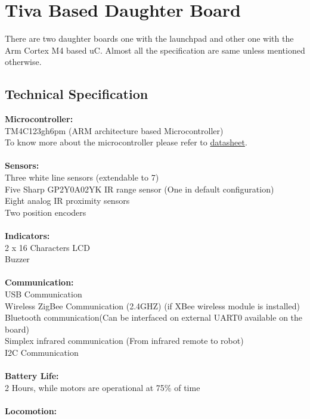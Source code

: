 \documentclass[a4paper,10pt,oneside]{article}
\begin{document}
{	\section{\Huge\textbf{Tiva Based Daughter Board}}
		{There are two daughter boards one with the launchpad and other one with the Arm Cortex M4 based uC. Almost all the specification are same unless mentioned otherwise.\\}
		\subsection{{\huge \textbf{Technical Specification}}\\}
			{\textbf{Microcontroller:\\}
			TM4C123gh6pm (ARM architecture based Microcontroller)\\ To know more about the microcontroller please refer to \href{www.ti.com/lit/gpn/tm4c123gh6pm}{datasheet}.\\ \\}
			{\textbf{Sensors:}\\
			Three white line sensors (extendable to 7)\\
			Five Sharp GP2Y0A02YK IR range sensor (One in default configuration)\\
			Eight analog IR proximity sensors\\
			Two position encoders\\\\} 
			\textbf{Indicators:\\}
			{2 x 16 Characters LCD\\
			Buzzer\\\\}
			\textbf{Communication:\\}
			{USB Communication\\
			Wireless ZigBee Communication (2.4GHZ) (if XBee wireless module is installed)\\
			Bluetooth communication(Can be interfaced on external UART0 available on the board)\\
			Simplex infrared communication (From infrared remote to robot)\\
			I2C Communication \\\\}
			\textbf{Battery Life:\\}
			{2 Hours, while motors are operational at 75\% of time\\\\}
			\textbf{Locomotion:\\}
}
\end{document}
